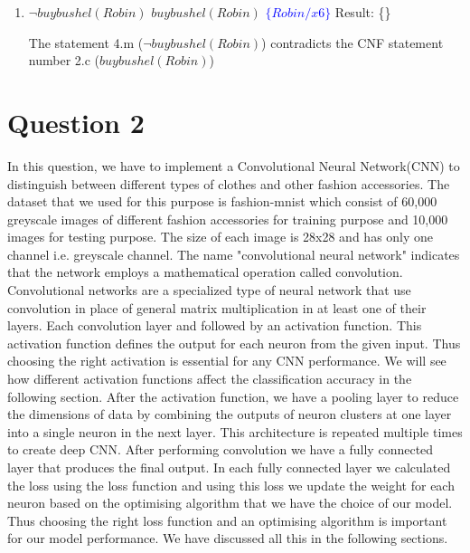 \documentclass[11pt]{article}
\begin{document}
\begin{enumerate}
\begin{enumerate}
\item $\neg buybushel(Robin)$ \hspace{1cm} $buybushel(Robin)$ \hspace{1cm} \textcolor{blue}{$\{Robin/x6\}$ } \newline 
Result: \{\}  


The statement 4.m ($\neg buybushel(Robin)$) contradicts the CNF statement number 2.c ($buybushel(Robin)$)
\end{enumerate}
\end{enumerate}
\section*{Question 2}
In this question, we have to implement a Convolutional Neural Network(CNN) to distinguish between different types of clothes and other fashion accessories. The dataset that we used for this purpose is 
fashion-mnist which consist of 60,000 greyscale images of different fashion accessories for training purpose and 10,000 images for testing purpose. The size of each image is 28x28 and has only one channel i.e. greyscale channel. The name "convolutional neural network" indicates that the network employs a mathematical operation called convolution. Convolutional networks are a specialized type of neural network that use convolution in place of general matrix multiplication in at least one of their layers. Each convolution layer and followed by an activation function. This activation function defines the output for each neuron from the given input. Thus choosing the right activation is essential for any CNN performance. We will see how different activation functions affect the classification accuracy in the following section. After the activation function, we have a pooling layer to reduce the dimensions of data by combining the outputs of neuron clusters at one layer into a single neuron in the next layer. This architecture is repeated multiple times to create deep CNN. After performing convolution we have a fully connected layer that produces the final output. In each fully connected layer we calculated the loss using the loss function and using this loss we update the weight for each neuron based on the optimising algorithm that we have the choice of our model. Thus choosing the right loss function and an optimising algorithm is important for our model performance. We have discussed all this in the following sections.
\end{document}
